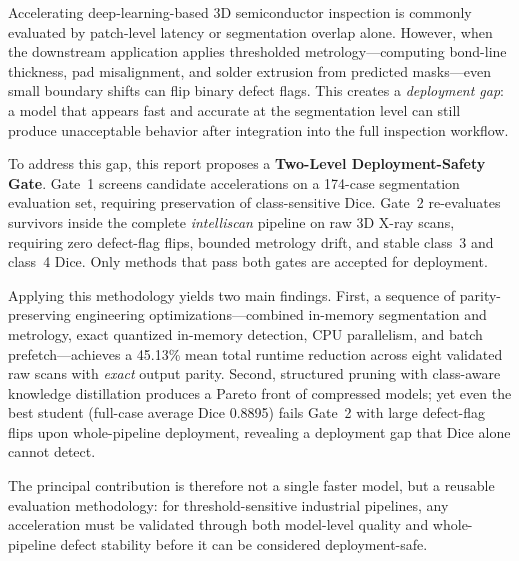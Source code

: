 Accelerating deep-learning-based 3D semiconductor inspection is commonly evaluated by patch-level latency or segmentation overlap alone. However, when the downstream application applies thresholded metrology---computing bond-line thickness, pad misalignment, and solder extrusion from predicted masks---even small boundary shifts can flip binary defect flags. This creates a \emph{deployment gap}: a model that appears fast and accurate at the segmentation level can still produce unacceptable behavior after integration into the full inspection workflow.

To address this gap, this report proposes a \textbf{Two-Level Deployment-Safety Gate}. Gate~1 screens candidate accelerations on a 174-case segmentation evaluation set, requiring preservation of class-sensitive Dice. Gate~2 re-evaluates survivors inside the complete \emph{intelliscan} pipeline on raw 3D X-ray scans, requiring zero defect-flag flips, bounded metrology drift, and stable class~3 and class~4 Dice. Only methods that pass both gates are accepted for deployment.

Applying this methodology yields two main findings. First, a sequence of parity-preserving engineering optimizations---combined in-memory segmentation and metrology, exact quantized in-memory detection, CPU parallelism, and batch prefetch---achieves a 45.13\% mean total runtime reduction across eight validated raw scans with \emph{exact} output parity. Second, structured pruning with class-aware knowledge distillation produces a Pareto front of compressed models; yet even the best student (full-case average Dice 0.8895) fails Gate~2 with large defect-flag flips upon whole-pipeline deployment, revealing a deployment gap that Dice alone cannot detect.

The principal contribution is therefore not a single faster model, but a reusable evaluation methodology: for threshold-sensitive industrial pipelines, any acceleration must be validated through both model-level quality and whole-pipeline defect stability before it can be considered deployment-safe.
